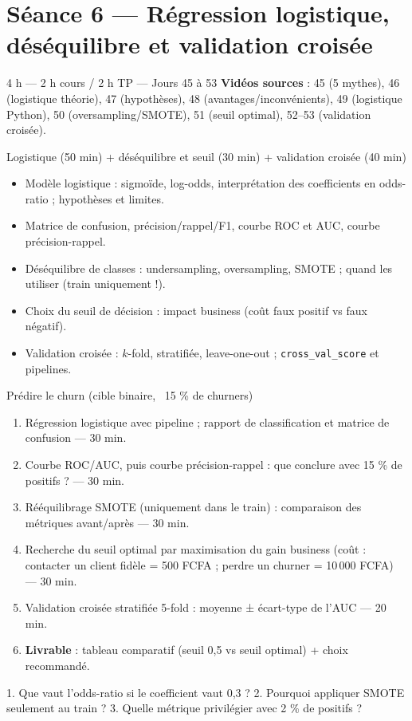 \documentclass[11pt,a4paper]{article}
\begin{document}
\section*{Séance 6 — Régression logistique, déséquilibre et validation croisée}
\begin{seancebox}{4 h — 2 h cours / 2 h TP — Jours 45 à 53}
\textbf{Vidéos sources} : 45 (5 mythes), 46 (logistique théorie), 47 (hypothèses), 48 (avantages/inconvénients), 49 (logistique Python), 50 (oversampling/SMOTE), 51 (seuil optimal), 52--53 (validation croisée).
\end{seancebox}
\begin{coursbox}{Logistique (50 min) + déséquilibre et seuil (30 min) + validation croisée (40 min)}
\begin{itemize}[nosep]
\item Modèle logistique : sigmoïde, log-odds, interprétation des coefficients en odds-ratio ; hypothèses et limites.
\item Matrice de confusion, précision/rappel/F1, courbe ROC et AUC, courbe précision-rappel.
\item Déséquilibre de classes : undersampling, oversampling, SMOTE ; quand les utiliser (train uniquement !).
\item Choix du seuil de décision : impact business (coût faux positif vs faux négatif).
\item Validation croisée : $k$-fold, stratifiée, leave-one-out ; \texttt{cross\_val\_score} et pipelines.
\end{itemize}
\end{coursbox}
\begin{tpbox}{Prédire le churn (cible binaire, ~15 \% de churners)}
\begin{enumerate}[nosep]
\item Régression logistique avec pipeline ; rapport de classification et matrice de confusion — 30 min.
\item Courbe ROC/AUC, puis courbe précision-rappel : que conclure avec 15 \% de positifs ? — 30 min.
\item Rééquilibrage SMOTE (uniquement dans le train) : comparaison des métriques avant/après — 30 min.
\item Recherche du seuil optimal par maximisation du gain business (coût : contacter un client fidèle = 500 FCFA ; perdre un churner = 10\,000 FCFA) — 30 min.
\item Validation croisée stratifiée 5-fold : moyenne ± écart-type de l'AUC — 20 min.
\item \textbf{Livrable} : tableau comparatif (seuil 0,5 vs seuil optimal) + choix recommandé.
\end{enumerate}
\end{tpbox}
\begin{evalbox}
1. Que vaut l'odds-ratio si le coefficient vaut 0,3 ? 2. Pourquoi appliquer SMOTE seulement au train ? 3. Quelle métrique privilégier avec 2 \% de positifs ?
\end{evalbox}
\end{document}
